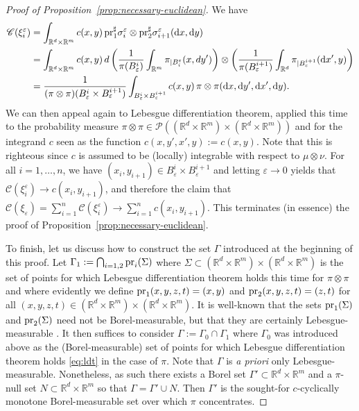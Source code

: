 \documentclass[leqno, 11pt, a4paper]{amsart}
\theoremstyle{definition}
\newcommand{\R}{\mathbb{R}}
\newcommand{\C}{\mathscr{C}}
\newcommand{\eps}{\varepsilon}
\newcommand{\cP}{\mathcal{P}}
\newcommand{\pr}{{\rm pr}}
\newcommand{\dd}{\mathrm{d}}
\begin{document}
\begin{proof}[Proof of Proposition~\ref{prop:necessary-euclidean}]
    We have
	\begin{align*}
			\C(\xi_i^\eps) &= \int_{\R^d \times \R^m} c(x, y) \,  \pr_1^\sharp \sigma_i^\eps \otimes \pr_2^\sharp \sigma_{i+1}^\eps(\dd x, \dd y) \\
			&=  \int_{\R^d \times \R^m} c(x, y) \,d  \left(\frac{1}{\pi(B_\eps^i)}\int_{\R^m} \pi_{|B_{i}^\eps}(x, d y')\right) \otimes \left(\frac{1}{\pi(B_\eps^{i+1})}\int_{\R^d} \pi_{|B_\eps^{i+1}}(\dd x', y)\right) \\
			&=\frac{1}{(\pi \otimes \pi)(B_\eps^i \times B_\eps^{i+1})} \int_{B_\eps^i \times B_\eps^{i+1}} c(x, y) \,  \pi \otimes \pi(\dd x, \dd y', \dd x', \dd y).
	\end{align*} 
We can then appeal again to Lebesgue differentiation theorem, applied this time to the probability measure $\pi \otimes \pi \in \cP((\R^d \times \R^m) \times (\R^d \times \R^m))$ and for the integrand $c$  seen as the function $c(x, y', x', y) := c(x, y)$. Note that this is righteous since $c$ is assumed to be (locally) integrable with respect to $\mu \otimes \nu$. For all $i = 1, \dots,n$, we have $(x_i, y_{i+1}) \in B_\eps^i \times B_\eps^{i+1}$ and letting $\eps \to 0$ yields that $\C(\xi_i^\eps) \to c(x_i, y_{i+1})$, and therefore the claim that $\C(\xi_\eps) = \sum_{i = 1}^n \C(\xi_i^\eps) \to \sum_{i = 1}^n c(x_i, y_{i+1})$. This terminates (in essence) the proof of Proposition~\ref{prop:necessary-euclidean}. 

To finish, let us discuss how to construct the set $\Gamma$ introduced at the beginning of this proof. Let $\Gamma_1 := \bigcap_{i = 1, 2}\pr_i(\Sigma)$ where $\Sigma \subset (\R^d \times \R^m) \times (\R^d \times \R^m)$ is the set of points for which Lebesgue differentiation theorem holds this time for $\pi \otimes \pi$ and where evidently we define $\pr_1(x, y, z, t) = (x, y)$ and $\pr_2(x, y, z, t) = (z, t)$ for all $(x, y, z, t) \in (\R^d \times \R^m) \times (\R^d \times \R^m)$. It is well-known that the sets $\pr_1(\Sigma)$ and $\pr_2(\Sigma)$ need not be Borel-measurable, but that they are certainly Lebesgue-measurable \cite[Theorem 2.12]{crauelRandomProbabilityMeasures2002}. It then suffices to consider $\Gamma := \Gamma_0 \cap \Gamma_1$ where $\Gamma_0$ was introduced above as the (Borel-measurable) set of points for which Lebesgue differentiation theorem holds  \eqref{eq:ldt} in the case of $\pi$. Note that $\Gamma$ is \textit{a priori} only Lebesgue-measurable. Nonetheless, as such there exists a Borel set $\Gamma' \subset \R^d \times \R^m$ and a $\pi$-null set $N \subset \R^d \times \R^m$ so that $\Gamma = \Gamma' \cup N$. Then $\Gamma'$ is the sought-for $c$-cyclically monotone Borel-measurable set over which $\pi$ concentrates.
	\end{proof}
\end{document}
